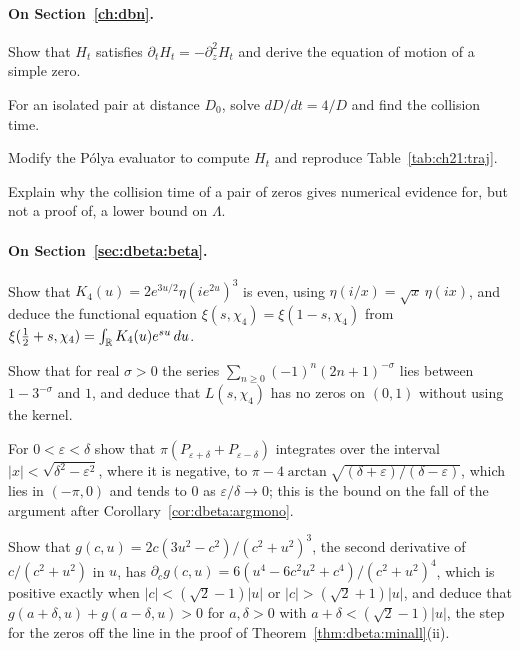 \paragraph{On Section~\ref{ch:dbn}.}
\begin{exercises}
\item\label{ex:ch21:motion} Show that $H_t$ satisfies $\partial_tH_t=-\partial_z^2H_t$ and derive the equation of motion of a simple zero.
\item\label{ex:ch21:pair} For an isolated pair at distance $D_0$, solve $dD/dt=4/D$ and find the collision time.
\item Modify the P\'olya evaluator to compute $H_t$ and reproduce Table~\ref{tab:ch21:traj}.
\item Explain why the collision time of a pair of zeros gives numerical evidence for, but not a proof of, a lower bound on $\Lambda$.
\end{exercises}

\paragraph{On Section~\ref{sec:dbeta:beta}.}
\begin{exercises}
\item Show that $K_4(u)=2e^{3u/2}\eta(ie^{2u})^3$ is even, using $\eta(i/x)=\sqrt x\,\eta(ix)$, and deduce the functional equation $\xi(s,\chi_4)=\xi(1-s,\chi_4)$ from $\xi(\frac12+s,\chi_4)=\int_{\mathbb{R}}K_4(u)e^{su}\,du$.
\item Show that for real $\sigma>0$ the series $\sum_{n\ge0}(-1)^n(2n+1)^{-\sigma}$ lies between $1-3^{-\sigma}$ and $1$, and deduce that $L(s,\chi_4)$ has no zeros on $(0,1)$ without using the kernel.
\item For $0<\varepsilon<\delta$ show that $\pi(P_{\varepsilon+\delta}+P_{\varepsilon-\delta})$ integrates over the interval $|x|<\sqrt{\delta^2-\varepsilon^2}$, where it is negative, to $\pi-4\arctan\sqrt{(\delta+\varepsilon)/(\delta-\varepsilon)}$, which lies in $(-\pi,0)$ and tends to $0$ as $\varepsilon/\delta\to0$; this is the bound on the fall of the argument after Corollary~\ref{cor:dbeta:argmono}.
\item Show that $g(c,u)=2c(3u^2-c^2)/(c^2+u^2)^3$, the second derivative of $c/(c^2+u^2)$ in $u$, has $\partial_cg(c,u)=6(u^4-6c^2u^2+c^4)/(c^2+u^2)^4$, which is positive exactly when $|c|<(\sqrt2-1)|u|$ or $|c|>(\sqrt2+1)|u|$, and deduce that $g(a+\delta,u)+g(a-\delta,u)>0$ for $a,\delta>0$ with $a+\delta<(\sqrt2-1)|u|$, the step for the zeros off the line in the proof of Theorem~\ref{thm:dbeta:minall}(ii).
\end{exercises}

